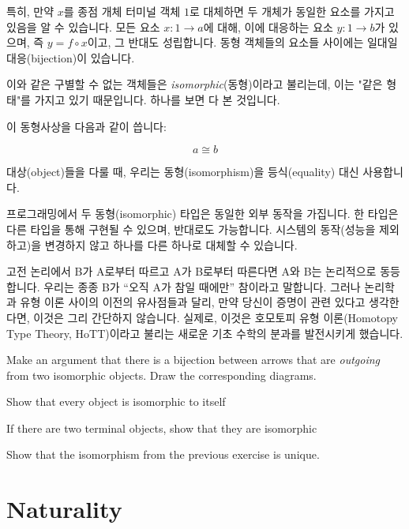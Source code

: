 \documentclass[DaoFP]{subfiles}
\begin{document}
특히, 만약 $x$를 종점 개체 터미널 객체 $1$로 대체하면 두 개체가 동일한 요소를 가지고 있음을 알 수 있습니다. 모든 요소 $x \colon 1 \to a$에 대해, 이에 대응하는 요소 $y \colon 1 \to b$가 있으며, 즉 $y = f \circ x$이고, 그 반대도 성립합니다. 동형 객체들의 요소들 사이에는 일대일 대응(bijection)이 있습니다.

이와 같은 구별할 수 없는 객체들은 \emph{isomorphic}(동형)이라고 불리는데, 이는 "같은 형태"를 가지고 있기 때문입니다. 하나를 보면 다 본 것입니다.

이 동형사상을 다음과 같이 씁니다:

\[a \cong b\]

대상(object)들을 다룰 때, 우리는 동형(isomorphism)을 등식(equality) 대신 사용합니다.

프로그래밍에서 두 동형(isomorphic) 타입은 동일한 외부 동작을 가집니다. 한 타입은 다른 타입을 통해 구현될 수 있으며, 반대로도 가능합니다. 시스템의 동작(성능을 제외하고)을 변경하지 않고 하나를 다른 하나로 대체할 수 있습니다.

고전 논리에서 B가 A로부터 따르고 A가 B로부터 따른다면 A와 B는 논리적으로 동등합니다. 우리는 종종 B가 ``오직 A가 참일 때에만'' 참이라고 말합니다. 그러나 논리학과 유형 이론 사이의 이전의 유사점들과 달리, 만약 당신이 증명이 관련 있다고 생각한다면, 이것은 그리 간단하지 않습니다. 실제로, 이것은 호모토피 유형 이론(Homotopy Type Theory, HoTT)이라고 불리는 새로운 기초 수학의 분과를 발전시키게 했습니다.

\begin{exercise}
Make an argument that there is a bijection between arrows that are \emph{outgoing} from two isomorphic objects. Draw the corresponding diagrams.
\end{exercise}


\begin{exercise}
Show that every object is isomorphic to itself
\end{exercise}

\begin{exercise}
If there are two terminal objects, show that they are isomorphic
\end{exercise}

\begin{exercise}
Show that the isomorphism from the previous exercise is unique.
\end{exercise}

\section{Naturality}
\end{document}
